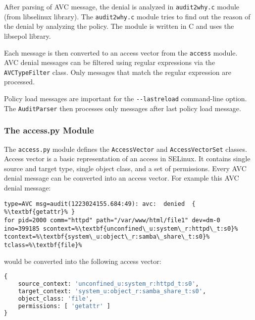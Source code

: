 After parsing of AVC message, the denial is analyzed in \texttt{audit2why.c}
module (from libselinux library). The \texttt{audit2why.c} module tries to find
out the reason of the denial by analyzing the policy. The module is written in C
and uses the libsepol library.

Each message is then converted to an access vector from the \texttt{access}
module. AVC denial messages can be filtered using regular expressions via the
\texttt{AVCTypeFilter} class. Only messages that match the regular expression
are processed.

Policy load messages are important for the \texttt{-{}-lastreload} command-line
option. The \texttt{AuditParser} then processes only messages after last policy
load message.

\subsubsection{The access.py Module}

The \texttt{access.py} module defines the \texttt{AccessVector} and
\texttt{AccessVectorSet} classes. Access vector is a basic representation of an
access in SELinux. It contains single source and target type, single object
class, and a set of permissions. Every AVC denial message can be converted into
an access vector. For example this AVC denial message:
\begin{lstlisting}[escapechar=\%]
type=AVC msg=audit(1223024155.684:49): avc:  denied  { %\textbf{getattr}% }
for pid=2000 comm="httpd" path="/var/www/html/file1" dev=dm-0
ino=399185 scontext=%\textbf{unconfined\_u:system\_r:httpd\_t:s0}%
tcontext=%\textbf{system\_u:object\_r:samba\_share\_t:s0}% tclass=%\textbf{file}%
\end{lstlisting}
would be converted into the following access vector:
\begin{lstlisting}[language=Python]
{
    source_context: 'unconfined_u:system_r:httpd_t:s0',
    target_context: 'system_u:object_r:samba_share_t:s0',
    object_class: 'file',
    permissions: [ 'getattr' ]
}
\end{lstlisting}


